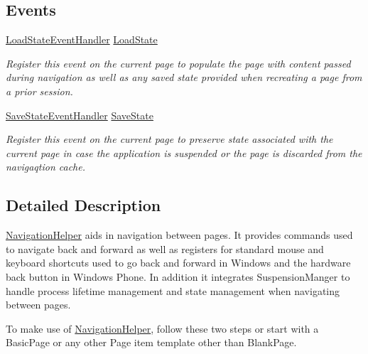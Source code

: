 \subsection*{Events}
\begin{DoxyCompactItemize}
\item 
\hyperlink{namespace__1aarsproeve_1_1_common_aee964a591f5ee233e54c70f38c9334cf}{Load\+State\+Event\+Handler} \hyperlink{class__1aarsproeve_1_1_common_1_1_navigation_helper_ab4abff9d3eb04794d05d43ff3846e344}{Load\+State}
\begin{DoxyCompactList}\small\item\em Register this event on the current page to populate the page with content passed during navigation as well as any saved state provided when recreating a page from a prior session. \end{DoxyCompactList}\item 
\hyperlink{namespace__1aarsproeve_1_1_common_acae0399935efb5f4aff5ba3cdfd92246}{Save\+State\+Event\+Handler} \hyperlink{class__1aarsproeve_1_1_common_1_1_navigation_helper_a627a89278c28e536b6e7fea11da6d465}{Save\+State}
\begin{DoxyCompactList}\small\item\em Register this event on the current page to preserve state associated with the current page in case the application is suspended or the page is discarded from the navigaqtion cache. \end{DoxyCompactList}\end{DoxyCompactItemize}


\subsection{Detailed Description}
\hyperlink{class__1aarsproeve_1_1_common_1_1_navigation_helper}{Navigation\+Helper} aids in navigation between pages. It provides commands used to navigate back and forward as well as registers for standard mouse and keyboard shortcuts used to go back and forward in Windows and the hardware back button in Windows Phone. In addition it integrates Suspension\+Manger to handle process lifetime management and state management when navigating between pages. 

To make use of \hyperlink{class__1aarsproeve_1_1_common_1_1_navigation_helper}{Navigation\+Helper}, follow these two steps or start with a Basic\+Page or any other Page item template other than Blank\+Page.

